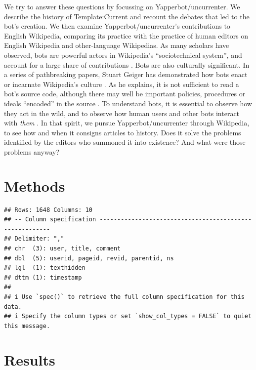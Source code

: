 \documentclass[Royal,times,sageh]{sagej}
\begin{document}
We try to answer these questions by focussing on Yapperbot/uncurrenter.
We describe the history of Template:Current and recount the debates that
led to the bot's creation. We then examine Yapperbot/uncurrenter's
contributions to English Wikipedia, comparing its practice with the
practice of human editors on English Wikipedia and other-language
Wikipedias. As many scholars have observed, bots are powerful actors in
Wikipedia's ``sociotechnical system'', and account for a large share of
contributions
\citetext{\citealp{niederer_wisdom_2010}; \citealp[pp.~137-140]{dijck_culture_2013}; \citealp{geiger_work_2010}; \citealp{geiger_when_2013}; \citealp{geiger_operationalizing_2017}; \citealp{halfaker_bots_2012}; \citealp{livingstone_population_2016}}.
Bots are also culturally significant. In a series of pathbreaking
papers, Stuart Geiger has demonstrated how bots enact or incarnate
Wikipedia's culture
\citetext{\citealp{geiger_social_2009}; \citealp{geiger_lives_2011}; \citealp{geiger_are_2013}; \citealp{geiger_beyond_2017}; \citealp[see
also][]{kennedy_textual_2010}}. As he explains, it is not sufficient to
read a bot's source code, although there may well be important policies,
procedures or ideals ``encoded'' in the source
\citep[p.~9]{geiger_beyond_2017}. To understand bots, it is essential to
observe how they act in the wild, and to observe how human users and
other bots interact with \emph{them}
\citep{geiger_lives_2011, geiger_beyond_2017}. In that spirit, we pursue
Yapperbot/uncurrenter through Wikipedia, to see how and when it consigns
articles to history. Does it solve the problems identified by the
editors who summoned it into existence? And what were those problems
anyway?

\hypertarget{methods}{%
\section{Methods}\label{methods}}

\begin{verbatim}
## Rows: 1648 Columns: 10
## -- Column specification --------------------------------------------------------
## Delimiter: ","
## chr  (3): user, title, comment
## dbl  (5): userid, pageid, revid, parentid, ns
## lgl  (1): texthidden
## dttm (1): timestamp
## 
## i Use `spec()` to retrieve the full column specification for this data.
## i Specify the column types or set `show_col_types = FALSE` to quiet this message.
\end{verbatim}

\hypertarget{results}{%
\section{Results}\label{results}}
\end{document}
